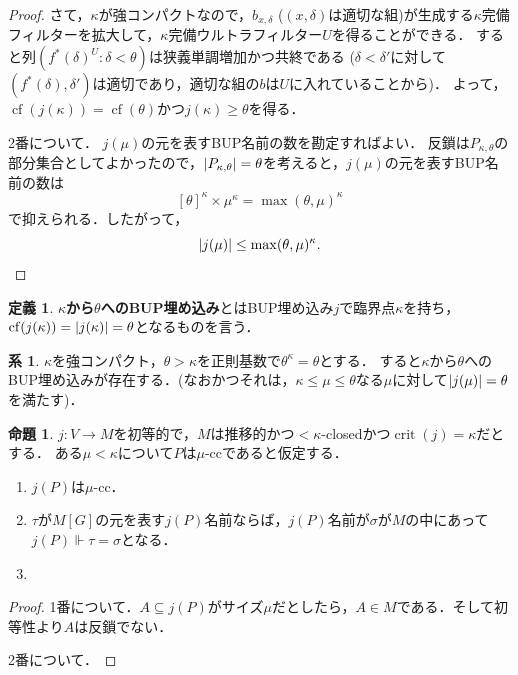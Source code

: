 \documentclass[uplatex,dvipdfmx]{jsarticle}
\newcommand\forces{\Vdash}
\newcommand{\cf}{\operatorname{cf}}
\newcommand{\crit}{\operatorname{crit}}
\DeclarePairedDelimiter\abs{\lvert}{\rvert}
\renewcommand\subset{\subseteq}
\theoremstyle{definition}
\newtheorem{defi}[thm]{定義}
\newtheorem{prop}[thm]{命題}
\newtheorem{cor}[thm]{系}
\newcommand{\todo}[1][]{%
	\ifthenelse{\equal{#1}{}}{%
		\textcolor{red}{[TODO]}%
	}{%
		\textcolor{red}{[TODO: #1]}%
	}%
}
\begin{document}
\begin{proof}
		さて，$\kappa$が強コンパクトなので，$b_{x, \delta}$ ($(x, \delta)$は適切な組)が生成する$\kappa$完備フィルターを拡大して，$\kappa$完備ウルトラフィルター$U$を得ることができる．
		すると列$(f^*(\delta)^U : \delta < \theta)$は狭義単調増加かつ共終である ($\delta < \delta'$に対して$(f^*(\delta), \delta')$は適切であり，適切な組の$b$は$U$に入れていることから)．
		よって，$\cf(j(\kappa)) = \cf(\theta)$かつ$j(\kappa) \ge \theta$を得る．

		2番について．
		$j(\mu)$の元を表すBUP名前の数を勘定すればよい．
		反鎖は$P_{\kappa,\theta}$の部分集合としてよかったので，$\abs{P_{\kappa,\theta}} = \theta$を考えると，$j(\mu)$の元を表すBUP名前の数は
		\[
			[\theta]^\kappa \times \mu^\kappa = \max(\theta, \mu)^\kappa
		\]
		で抑えられる．したがって，
		\[
		\abs{j(\mu)} \le \max(\theta, \mu)^\kappa.
		\]
	\end{proof}

	\begin{defi}
		\textbf{$\kappa$から$\theta$へのBUP埋め込み}とはBUP埋め込み$j$で臨界点$\kappa$を持ち，$\cf(j(\kappa)) = \abs{j(\kappa)} = \theta$となるものを言う．
	\end{defi}

	\begin{cor}
		$\kappa$を強コンパクト，$\theta > \kappa$を正則基数で$\theta^\kappa = \theta$とする．
		すると$\kappa$から$\theta$へのBUP埋め込みが存在する．(なおかつそれは，$\kappa \le \mu \le \theta$なる$\mu$に対して$\abs{j(\mu)} = \theta$を満たす)．
	\end{cor}

	\begin{prop}
		$j \colon V \to M$を初等的で，$M$は推移的かつ${<}\kappa$-closedかつ$\crit(j) = \kappa$だとする．
		ある$\mu < \kappa$について$P$は$\mu$-ccであると仮定する．
		\begin{enumerate}
			\item $j(P)$は$\mu$-cc．
			\item $\tau$が$M[G]$の元を表す$j(P)$名前ならば，$j(P)$名前が$\sigma$が$M$の中にあって$j(P) \forces \tau=\sigma$となる．
			\item \todo
		\end{enumerate}
	\end{prop}
	\begin{proof}
		1番について．$A \subset j(P)$がサイズ$\mu$だとしたら，$A \in M$である．そして初等性より$A$は反鎖でない．

		2番について．

		\todo
	\end{proof}
\end{document}
